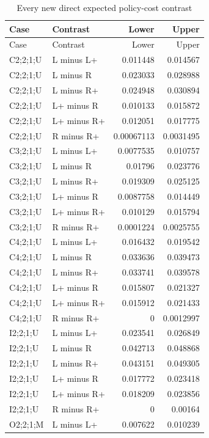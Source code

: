 {\small
\setlength{\tabcolsep}{3pt}
\begin{longtable}{@{}llrr@{}}
\caption{Every new direct expected policy-cost contrast}\label{tab:all-contrasts50}\\
\toprule
Case & Contrast & Lower & Upper \\
\midrule
\endfirsthead
\toprule
Case & Contrast & Lower & Upper \\
\midrule
\endhead
\bottomrule
\endfoot
C2;2;1;U & L minus L+ & 0.011448 & 0.014567 \\
C2;2;1;U & L minus R & 0.023033 & 0.028988 \\
C2;2;1;U & L minus R+ & 0.024948 & 0.030894 \\
C2;2;1;U & L+ minus R & 0.010133 & 0.015872 \\
C2;2;1;U & L+ minus R+ & 0.012051 & 0.017775 \\
C2;2;1;U & R minus R+ & 0.00067113 & 0.0031495 \\
C3;2;1;U & L minus L+ & 0.0077535 & 0.010757 \\
C3;2;1;U & L minus R & 0.01796 & 0.023776 \\
C3;2;1;U & L minus R+ & 0.019309 & 0.025125 \\
C3;2;1;U & L+ minus R & 0.0087758 & 0.014449 \\
C3;2;1;U & L+ minus R+ & 0.010129 & 0.015794 \\
C3;2;1;U & R minus R+ & 0.0001224 & 0.0025755 \\
C4;2;1;U & L minus L+ & 0.016432 & 0.019542 \\
C4;2;1;U & L minus R & 0.033636 & 0.039473 \\
C4;2;1;U & L minus R+ & 0.033741 & 0.039578 \\
C4;2;1;U & L+ minus R & 0.015807 & 0.021327 \\
C4;2;1;U & L+ minus R+ & 0.015912 & 0.021433 \\
C4;2;1;U & R minus R+ & 0 & 0.0012997 \\
I2;2;1;U & L minus L+ & 0.023541 & 0.026849 \\
I2;2;1;U & L minus R & 0.042713 & 0.048868 \\
I2;2;1;U & L minus R+ & 0.043151 & 0.049305 \\
I2;2;1;U & L+ minus R & 0.017772 & 0.023418 \\
I2;2;1;U & L+ minus R+ & 0.018209 & 0.023856 \\
I2;2;1;U & R minus R+ & 0 & 0.00164 \\
O2;2;1;M & L minus L+ & 0.007622 & 0.010239 \\

\end{longtable}}
